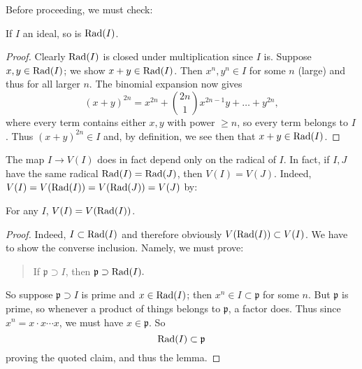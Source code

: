 Before proceeding, we must check:
\begin{lemma} 
If $I$ an ideal, so is $\operatorname{Rad}(I)$.
\end{lemma} 
\begin{proof} 
Clearly $\operatorname{Rad}(I)$ is closed under multiplication since $I$ is.  
Suppose $x,y \in \operatorname{Rad}(I)$; we show $x+y \in \operatorname{Rad}(I)$.  Then $x^n, y^n \in I$
for some $n$ (large) and thus for all larger $n$. The binomial expansion now
gives
\[ (x+y)^{2n} = x^{2n} + \binom{2n}{1} x^{2n-1}y + \dots + y^{2n},  \]
where every term contains either $x,y$ with power $ \geq n$, so every term
belongs to $I$.  Thus $(x+y)^{2n} \in I$ and, by definition, we see then that $x+y \in \operatorname{Rad}(I)$. 
\end{proof} 

The map $I \to V(I)$ does in fact depend only on the radical of $I$. In fact, if $I,J$ have the same radical $\operatorname{Rad}(I) = \operatorname{Rad}(J)$, then $V(I) = V(J)$. 
Indeed, $V(I) = V(\operatorname{Rad}(I)) = V(\operatorname{Rad}(J)) = V(J)$ by:
\begin{lemma} 
For any $I$, $V(I) = V(\operatorname{Rad}(I))$.
\end{lemma} 
\begin{proof} 
Indeed, $I \subset \operatorname{Rad}(I)$ and therefore obviously $V(\operatorname{Rad}(I)) \subset V(I)$. We have to show the
converse inclusion. Namely, we must prove:
\begin{quote}
If $\mathfrak{p} \supset I$, then $\mathfrak{p} \supset  \operatorname{Rad}(I).$
\end{quote}
So suppose $\mathfrak{p} \supset I$ is prime and $x \in \operatorname{Rad}(I)$; then $x^n \in I \subset \mathfrak{p}$ for some $n$.
But $\mathfrak{p}$ is prime, so whenever a  product of things belongs to
$\mathfrak{p}$, a factor does.  Thus since $x^n = x \cdot x \cdots x$, we must
have $x \in \mathfrak{p}$. So
\[ \operatorname{Rad}(I) \subset \mathfrak{p}  \]
proving the quoted claim, and thus the lemma.
\end{proof} 

